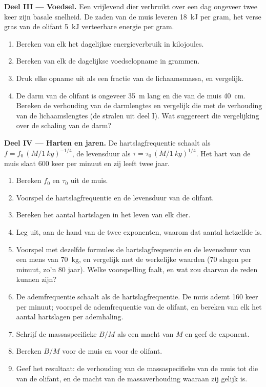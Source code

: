 \begin{problem}
\medskip
\noindent\textbf{Deel III --- Voedsel.}
Een vrijlevend dier verbruikt over een dag ongeveer twee keer zijn basale
snelheid. De zaden van de muis leveren \qty{18}{kJ} per gram, het verse gras
van de olifant \qty{5}{kJ} verteerbare energie per gram.
\begin{enumerate}[resume]
  \item Bereken van elk het dagelijkse energieverbruik in kilojoules.
  \item Bereken van elk de dagelijkse voedselopname in grammen.
  \item Druk elke opname uit als een fractie van de lichaamsmassa, en
        vergelijk.
  \item De darm van de olifant is ongeveer \qty{35}{m} lang en die van de muis
        \qty{40}{cm}. Bereken de verhouding van de darmlengtes en vergelijk die
        met de verhouding van de lichaamslengtes (de stralen uit deel I). Wat
        suggereert die vergelijking over de schaling van de darm?
\end{enumerate}

\medskip
\noindent\textbf{Deel IV --- Harten en jaren.}
De hartslagfrequentie schaalt als $f = f_0\,(M/\qty{1}{kg})^{-1/4}$, de
levensduur als $\tau = \tau_0\,(M/\qty{1}{kg})^{1/4}$. Het hart van de muis
slaat \qty{600}{} keer per minuut en zij leeft twee jaar.
\begin{enumerate}[resume]
  \item Bereken $f_0$ en $\tau_0$ uit de muis.
  \item Voorspel de hartslagfrequentie en de levensduur van de olifant.
  \item Bereken het aantal hartslagen in het leven van elk dier.
  \item Leg uit, aan de hand van de twee exponenten, waarom dat aantal
        hetzelfde is.
  \item Voorspel met dezelfde formules de hartslagfrequentie en de levensduur
        van een mens van \qty{70}{kg}, en vergelijk met de werkelijke waarden
        (\qty{70}{} slagen per minuut, zo'n \qty{80}{} jaar). Welke voorspelling
        faalt, en wat zou daarvan de reden kunnen zijn?
  \item De ademfrequentie schaalt als de hartslagfrequentie. De muis ademt
        \qty{160}{} keer per minuut; voorspel de ademfrequentie van de olifant,
        en bereken van elk het aantal hartslagen per ademhaling.
  \item Schrijf de massaspecifieke  $B/M$ als een macht
        van $M$ en geef de exponent.
  \item Bereken $B/M$ voor de muis en voor de olifant.
  \item Geef het resultaat: de verhouding van de massaspecifieke
         van de muis tot die van de olifant, en de macht
        van de massaverhouding waaraan zij gelijk is.
\end{enumerate}
\end{problem}

